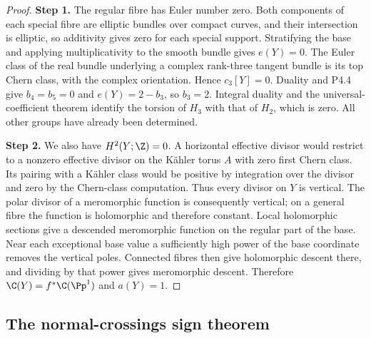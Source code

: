 \begin{proof}
\noindent\textbf{Step 1.} The regular fibre has Euler number zero. Both components of each special
fibre are elliptic bundles over compact curves, and their intersection is
elliptic, so additivity gives zero for each special support. Stratifying
the base and applying multiplicativity to the smooth bundle gives
$e(Y)=0$. The Euler class of the real bundle underlying a complex
rank-three tangent bundle is its top Chern class, with the complex
orientation. Hence $c_3[Y]=0$. Duality and P4.4 give $b_4=b_5=0$ and
$e(Y)=2-b_3$, so $b_3=2$. Integral duality and the universal-coefficient
theorem identify the torsion of $H_3$ with that of $H_2$, which is zero.
All other groups have already been determined.

\noindent\textbf{Step 2.} We also have $H^2(Y;\Z)=0$. A horizontal effective divisor would restrict
to a nonzero effective divisor on the Kähler torus $A$ with zero first
Chern class. Its pairing with a Kähler class would be positive by
integration over the divisor and zero by the Chern-class computation.
Thus every divisor on $Y$ is vertical. The polar divisor of a meromorphic
function is consequently vertical; on a general fibre the function is
holomorphic and therefore constant. Local holomorphic sections give a
descended meromorphic function on the regular part of the base. Near
each exceptional base value a sufficiently high power of the base
coordinate removes the vertical poles. Connected fibres then give
holomorphic descent there, and dividing by that power gives meromorphic
descent. Therefore $\C(Y)=f^*\C(\Pp^1)$ and $a(Y)=1$.
\end{proof}

\subsection{The normal-crossings sign theorem}

